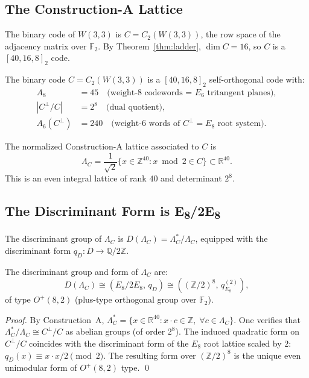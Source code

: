\subsection{The Construction-A Lattice}

The binary code of $W(3,3)$ is $C = C_2(W(3,3))$, the row space of the adjacency
matrix over $\mathbb{F}_2$. By Theorem~\ref{thm:ladder}, $\dim C = 16$, so
$C$ is a $[40,16,8]_2$ code.

\begin{theorem}
\label{thm:code}
The binary code $C = C_2(W(3,3))$ is a $[40,16,8]_2$ self-orthogonal code with:
\begin{align*}
A_8 &= 45 \quad \text{(weight-8 codewords = $E_6$ tritangent planes)},\\
|C^\perp / C| &= 2^8 \quad \text{(dual quotient)},\\
A_6(C^\perp) &= 240 \quad \text{(weight-6 words of } C^\perp = E_8 \text{ root system)}.
\end{align*}
\end{theorem}

The normalized Construction-A lattice associated to $C$ is
$$\Lambda_C = \frac1{\sqrt2}\{x \in \mathbb{Z}^{40} : x \bmod 2 \in C\}
\subset \mathbb{R}^{40}.$$
This is an even integral lattice of rank $40$ and determinant $2^8$.

\subsection{The Discriminant Form is E\textsubscript{8}/2E\textsubscript{8}}

The discriminant group of $\Lambda_C$ is $D(\Lambda_C) = \Lambda_C^*/\Lambda_C$,
equipped with the discriminant form $q_D: D \to \mathbb{Q}/2\mathbb{Z}$.

\begin{theorem}
\label{thm:disc}
The discriminant group and form of $\Lambda_C$ are:
$$D(\Lambda_C) \cong (E_8/2E_8, \, q_D) \cong ((\mathbb{Z}/2)^8, \, q_{E_8}^{(2)}),$$
of type $O^+(8,2)$ (plus-type orthogonal group over $\mathbb{F}_2$).
\end{theorem}

\begin{proof}
By Construction~A, $\Lambda_C^* = \{x \in \mathbb{R}^{40} : x \cdot c \in \mathbb{Z},\; \forall c \in \Lambda_C\}$.
One verifies that $\Lambda_C^*/\Lambda_C \cong C^\perp/C$ as abelian groups (of order $2^8$).
The induced quadratic form on $C^\perp/C$ coincides with the discriminant form of the
$E_8$ root lattice scaled by $2$: $q_D(x) \equiv x \cdot x / 2 \pmod{2}$.
The resulting form over $(\mathbb{Z}/2)^8$ is the unique even unimodular form
of $O^+(8,2)$ type. \qed
\end{proof}

